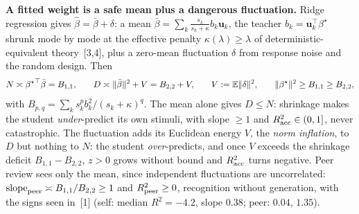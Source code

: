 \documentclass[12pt,letterpaper]{article}
\newcommand{\runsection}[1]{\par\vskip0pt plus 3\baselineskip\penalty-100\vskip0pt plus -3\baselineskip\vspace{1.5pt}\noindent\textbf{#1}\hspace{0.5em}\ignorespaces}
\newcommand{\bhat}{\hat{\beta}}
\newcommand{\bstar}{{\beta^{\star}}}
\newcommand{\uvec}{\mathbf{u}}
\newcommand{\E}{\mathbb{E}}
\begin{document}
\runsection{A fitted weight is a safe mean plus a dangerous fluctuation.}
Ridge regression gives $\bhat=\bar\beta+\delta$: a mean $\bar\beta=\sum_k\frac{s_k}{s_k+\kappa}b_k\uvec_k$, the teacher $b_k=\uvec_k^\top\bstar$ shrunk mode by mode at the effective penalty $\kappa(\lambda)\ge\lambda$ of deterministic-equivalent theory~[3,4], plus a zero-mean fluctuation $\delta$ from response noise and the random design. Then
\begin{equation}\small
N\asymp\bstar^\top\bar\beta=B_{1,1},\qquad
D\asymp\|\bar\beta\|^2+V=B_{2,2}+V,\qquad V:=\E\|\delta\|^2,\qquad
\|\bstar\|^2\ge B_{1,1}\ge B_{2,2},
\label{eq:de}
\end{equation}
with $B_{p,q}=\sum_k s_k^pb_k^2/(s_k+\kappa)^q$. The mean alone gives $D\le N$: shrinkage makes the student \emph{under}-predict its own stimuli, with slope $\ge1$ and $R^2_{\rm acc}\in(0,1]$, never catastrophic. The fluctuation adds its Euclidean energy $V$, the \emph{norm inflation}, to $D$ but nothing to $N$: the student \emph{over}-predicts, and once $V$ exceeds the shrinkage deficit $B_{1,1}-B_{2,2}$, $z>0$ grows without bound and $R^2_{\rm acc}$ turns negative. Peer review sees only the mean, since independent fluctuations are uncorrelated: $\mathrm{slope}_{\rm peer}\asymp B_{1,1}/B_{2,2}\ge1$ and $R^2_{\rm peer}\ge0$, recognition without generation, with the signs seen in~[1] (self: median $R^2=-4.2$, slope $0.38$; peer: $0.04$, $1.35$).
\end{document}
